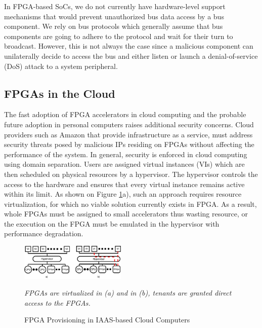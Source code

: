 \documentclass[sigconf]{acmart}
\theoremstyle{plain}
\theoremstyle{remark}
\begin{document}
In FPGA-based SoCs, we do not currently have hardware-level support mechanisms that would prevent unauthorized bus data access by a bus component. We rely on bus protocols which generally assume that bus components are going to adhere to the protocol and wait for their turn to broadcast. However, this is not always the case since a malicious component can unilaterally decide to access the bus and either listen or launch a denial-of-service (DoS) attack to a system peripheral.



\subsection{FPGAs in the Cloud}

The fast adoption of FPGA accelerators in cloud computing and the probable future adoption in personal computers raises additional security concerns. Cloud providers such as Amazon that provide infrastructure as a service, must address security threats posed by malicious IPs residing on FPGAs without affecting the performance of the system. In general, security is enforced in cloud computing using domain separation. Users are assigned virtual instances (VIs) which are then scheduled on physical resources by a hypervisor. The hypervisor controls the access to the hardware and ensures that every virtual instance remains active within its limit. As shown on Figure \ref{fig:iaas-fpga}a), such an approach requires resource virtualization, for which no viable solution currently exists in FPGA. As a result, whole FPGAs must be assigned to small accelerators thus wasting resource, or the execution on the FPGA must be emulated in the hypervisor with performance degradation.

\begin{figure}[h]
\centering
\includegraphics[width=0.45\textwidth]{figures/CloudThreatModel.pdf}
\caption{FPGA Provisioning in IAAS-based Cloud Computers}
\textit{FPGAs are virtualized in (a) and in (b), tenants are granted direct access to the FPGAs.}
\label{fig:iaas-fpga}
\end{figure}
\end{document}
